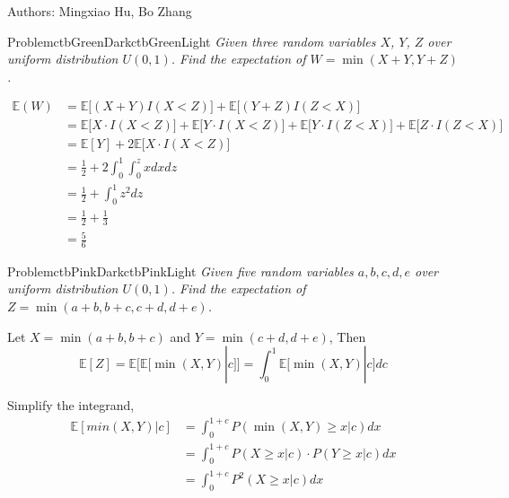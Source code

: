 \documentclass[12pt]{simple_doc}
\begin{document}

    Authors: Mingxiao Hu, Bo Zhang

    \begin{cbstripe}{Problem}{ctbGreenDark}{ctbGreenLight}
        \textit{Given three random variables $X$, $Y$, $Z$ over uniform distribution $U(0, 1)$. Find
        the expectation of $W = \min(X + Y, Y + Z)$.}
    \end{cbstripe}

    \begin{equation*}
		\begin{aligned}
		\mathbb{E}(W) &= \mathbb{E}\Big[(X + Y)I(X < Z)\Big] + \mathbb{E}\Big[(Y + Z)I(Z < X)\Big] \\
		   &= \mathbb{E}\Big[X\cdot I(X < Z)\Big] + \mathbb{E}\Big[Y\cdot I(X < Z)\Big]
                + \mathbb{E}\Big[Y\cdot I(Z < X)\Big] + \mathbb{E}\Big[Z\cdot I(Z < X)\Big]\\
           &= \mathbb{E}[Y] + 2 \mathbb{E}\Big[X\cdot I(X < Z)\Big] \\
           &= \frac{1}{2} + 2 \int_0^1 \int_0^z xdxdz \\
           &= \frac{1}{2} + \int_0^1 z^2 dz \\
           &= \frac{1}{2} + \frac{1}{3} \\
           &= \frac{5}{6}
		\end{aligned}
	\end{equation*}


    \begin{cbstripe}{Problem}{ctbPinkDark}{ctbPinkLight}
        \textit{Given five random variables $a, b, c, d, e$ over uniform distribution $U(0, 1)$. Find
        the expectation of $Z = \min(a + b, b + c, c + d, d + e)$.}
    \end{cbstripe}

    Let $X = \min(a + b, b + c)$ and $Y = \min(c + d, d + e)$, Then
    \begin{equation*}
        \mathbb{E}[Z] = \mathbb{E}\Big[\mathbb{E}\big[\min(X, Y)|c\big]\Big]
            = \int_0^1 \mathbb{E}\big[\min(X, Y)|c\big]dc
    \end{equation*}

    Simplify the integrand,
    \begin{equation*}
        \begin{aligned}
        \mathbb{E}[min(X, Y)|c] &= \int_0^{1 + c} P(\min(X, Y) \geqslant x | c) dx\\
            &= \int_0^{1 + c} P(X \geqslant x | c) \cdot P(Y \geqslant x | c) dx\\
            &= \int_0^{1 + c} P^2 (X \geqslant x | c)  dx
        \end{aligned}
    \end{equation*}
\end{document}
